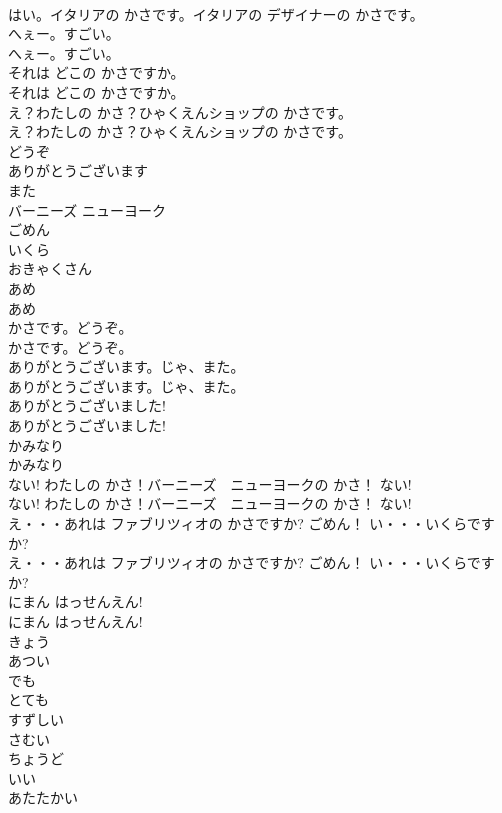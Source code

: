 \documentclass[8pt]{extreport}
\begin{document}
\begin{CJK}{UTF8}{min}
\\	はい。イタリアの かさです。イタリアの デザイナーの かさです。 
\\	へぇー。すごい。	
\\	へぇー。すごい。 
\\	それは どこの かさですか。	
\\	それは どこの かさですか。 
\\	え？わたしの かさ？ひゃくえんショップの かさです。	
\\	え？わたしの かさ？ひゃくえんショップの かさです。 
\\	どうぞ
\\	ありがとうございます
\\	また
\\	バーニーズ ニューヨーク
\\	ごめん
\\	いくら
\\	おきゃくさん
\\	あめ	
\\	あめ 
\\	かさです。どうぞ。	
\\	かさです。どうぞ。 
\\	ありがとうございます。じゃ、また。	
\\	ありがとうございます。じゃ、また。 
\\	ありがとうございました!	
\\	ありがとうございました! 
\\	かみなり	
\\	かみなり 
\\	ない! わたしの かさ！バーニーズ　ニューヨークの かさ！ ない!	
\\	ない! わたしの かさ！バーニーズ　ニューヨークの かさ！ ない! 
\\	え・・・あれは ファブリツィオの かさですか? ごめん！ い・・・いくらですか?	
\\	え・・・あれは ファブリツィオの かさですか? ごめん！ い・・・いくらですか? 
\\	にまん はっせんえん!	
\\	にまん はっせんえん! 
\\	きょう
\\	あつい
\\	でも
\\	とても
\\	すずしい
\\	さむい
\\	ちょうど
\\	いい
\\	あたたかい

\end{CJK}
\end{document}
